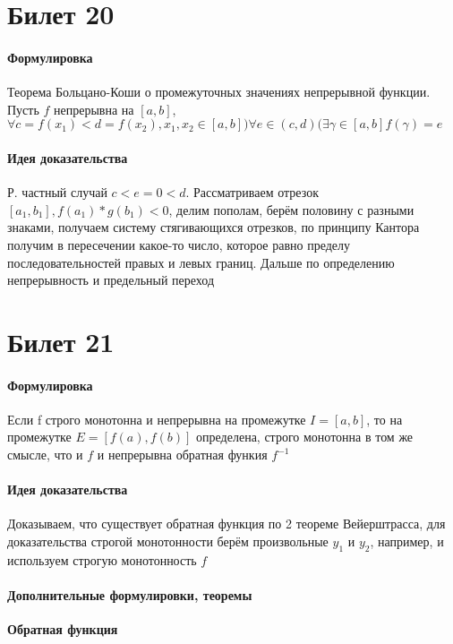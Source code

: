\documentclass[a4paper,10pt]{article}
\begin{document}
	\section{Билет 20}
	\begin{center} 
		\item \paragraph{Формулировка} 
	\end{center}
	Теорема Больцано-Коши о промежуточных значениях непрерывной функции. Пусть $f$ непрерывна на $[a,b]$, $\forall c = f(x_{1}) < d = f(x_{2}), x_{1}, x_{2} \in [a,b]) \forall e \in (c,d) (\exists \gamma \in [a,b] f(\gamma) = e$
	\begin{center} 
		\item \paragraph{Идея доказательства} 
	\end{center}
	Р. частный случай $c < e = 0 < d$. Рассматриваем отрезок $[a_{1}, b_{1}], f(a_{1})*g(b_{1}) < 0$, делим пополам, берём половину с разными знаками, получаем систему стягивающихся отрезков, по принципу Кантора получим в пересечении какое-то число, которое равно пределу последовательностей правых и левых границ. Дальше по определению непрерывность и предельный переход
	\section{Билет 21}
	\begin{center} 
		\item \paragraph{Формулировка} 
	\end{center}
	Если f строго монотонна и непрерывна на промежутке $I = [a,b]$, то на промежутке $E = [f(a), f(b)]$ определена, строго монотонна в том же смысле, что и $f$ и непрерывна обратная функия $f^{-1}$
	\begin{center} 
		\item \paragraph{Идея доказательства} 
	\end{center}
	Доказываем, что существует обратная функция по 2 теореме Вейерштрасса, для доказательства строгой монотонности берём произвольные $y_{1}$ и                      $y_{2}$, например, и используем строгую монотонность $f$
	\begin{center} 
		\item \paragraph{Дополнительные формулировки, теоремы} 
	\end{center}
	\textbf{Обратная функция}
\end{document}
